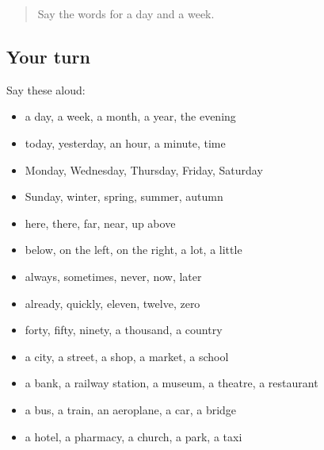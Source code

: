 \begin{quote}
Say the words for a day and a week.
\end{quote}

\subsection*{Your turn}
Say these aloud:

\begin{itemize}
\raggedright
  \item a day, a week, a month, a year, the evening
  \item today, yesterday, an hour, a minute, time
  \item Monday, Wednesday, Thursday, Friday, Saturday
  \item Sunday, winter, spring, summer, autumn
  \item here, there, far, near, up above
  \item below, on the left, on the right, a lot, a little
  \item always, sometimes, never, now, later
  \item already, quickly, eleven, twelve, zero
  \item forty, fifty, ninety, a thousand, a country
  \item a city, a street, a shop, a market, a school
  \item a bank, a railway station, a museum, a theatre, a restaurant
  \item a bus, a train, an aeroplane, a car, a bridge
  \item a hotel, a pharmacy, a church, a park, a taxi
\end{itemize}

